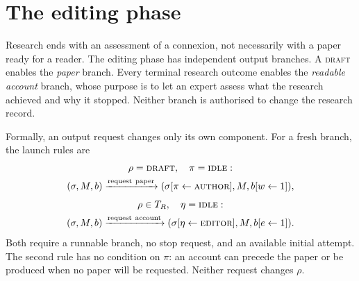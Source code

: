 \documentclass[11pt,a4paper]{article}
\newcommand{\st}[1]{\textsc{#1}}
\begin{document}
\section{The editing phase}

Research ends with an assessment of a connexion, not necessarily with a paper
ready for a reader. The editing phase has independent output branches. A
\st{draft} enables the \emph{paper} branch. Every terminal research outcome
enables the \emph{readable account} branch, whose purpose is to let an expert
assess what the research achieved and why it stopped. Neither branch is
authorised to change the research record.

Formally, an output request changes only its own component. For a fresh branch,
the launch rules are
\[
 \begin{gathered}
 \rho=\st{draft},\quad\pi=\st{idle}:\\
 (\sigma,M,b)\xrightarrow{\mathrm{request\ paper}}
  (\sigma[\pi\leftarrow\st{author}],M,b[w\leftarrow1]),\\[4pt]
 \rho\in T_R,\quad\eta=\st{idle}:\\
 (\sigma,M,b)\xrightarrow{\mathrm{request\ account}}
  (\sigma[\eta\leftarrow\st{editor}],M,b[e\leftarrow1]).
 \end{gathered}
\]
Both require a runnable branch, no stop request, and an available initial
attempt. The second rule has no condition on \(\pi\): an account can precede the
paper or be produced when no paper will be requested. Neither request changes
\(\rho\).
\end{document}
